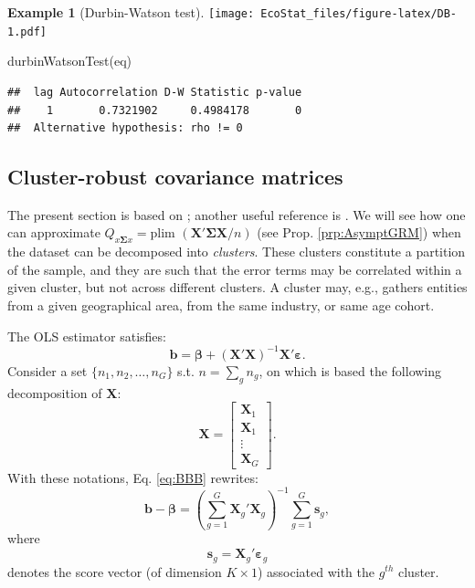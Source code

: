 \documentclass[
  12pt,
]{book}
\newenvironment{Shaded}{\begin{snugshade}}{\end{snugshade}}
\newcommand{\FunctionTok}[1]{\textcolor[rgb]{0.00,0.00,0.00}{#1}}
\newcommand{\NormalTok}[1]{#1}
\theoremstyle{definition}
\theoremstyle{definition}
\newtheorem{example}{Example}[chapter]
\theoremstyle{definition}
\theoremstyle{definition}
\theoremstyle{remark}
\begin{document}
\begin{example}[Durbin-Watson test]
\texttt{[image: EcoStat\_files/figure-latex/DB-1.pdf]}

\begin{Shaded}
\begin{Highlighting}[]
\FunctionTok{durbinWatsonTest}\NormalTok{(eq)}
\end{Highlighting}
\end{Shaded}

\begin{verbatim}
##  lag Autocorrelation D-W Statistic p-value
##    1       0.7321902     0.4984178       0
##  Alternative hypothesis: rho != 0
\end{verbatim}

\end{example}

\hypertarget{Clusters}{%
\subsection{Cluster-robust covariance matrices}\label{Clusters}}

The present section is based on \citet{MACKINNON2022}; another useful reference is \citet{Cameron_Miller_2014}. We will see how one can approximate \(Q_{x\boldsymbol\Sigma x}=\mbox{plim }(\mathbf{X}'\boldsymbol\Sigma\mathbf{X}/n)\) (see Prop. \ref{prp:AsymptGRM}) when the dataset can be decomposed into \emph{clusters}. These clusters constitute a partition of the sample, and they are such that the error terms may be correlated within a given cluster, but not across different clusters. A cluster may, e.g., gathers entities from a given geographical area, from the same industry, or same age cohort.

The OLS estimator satisfies:
\begin{equation}
\mathbf{b} = \boldsymbol\beta + (\mathbf{X}'\mathbf{X})^{-1}\mathbf{X}'\boldsymbol\varepsilon.\label{eq:BBB}
\end{equation}
Consider a set \(\{n_1,n_2,\dots,n_G\}\) s.t. \(n=\sum_g n_g\), on which is based the following decomposition of \(\mathbf{X}\):
\[
\mathbf{X} = \left[
\begin{array}{c}
\mathbf{X}_1 \\
\mathbf{X}_1 \\
\vdots\\
\mathbf{X}_G
\end{array}
\right].
\]
With these notations, Eq. \eqref{eq:BBB} rewrites:
\begin{equation}
\mathbf{b} - \boldsymbol\beta = \left(\sum_{g=1}^G \mathbf{X}_g'\mathbf{X}_g\right)^{-1}\sum_{g=1}^G \mathbf{s}_g,\label{eq:cluster1}
\end{equation}
where
\begin{equation}
\mathbf{s}_g = \mathbf{X}_g'\boldsymbol\varepsilon_g \label{eq:definiS}
\end{equation}
denotes the score vector (of dimension \(K \times 1\)) associated with the \(g^{th}\) cluster.
\end{document}
